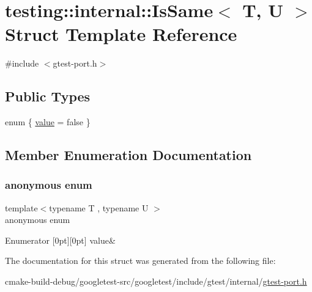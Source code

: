 \hypertarget{structtesting_1_1internal_1_1IsSame}{}\section{testing\+::internal\+::Is\+Same$<$ T, U $>$ Struct Template Reference}
\label{structtesting_1_1internal_1_1IsSame}


{\ttfamily \#include $<$gtest-\/port.\+h$>$}

\subsection*{Public Types}
\begin{DoxyCompactItemize}
\item 
enum \{ \mbox{\hyperlink{structtesting_1_1internal_1_1IsSame_a2cfeb9b5d672af954b14a257f26c67f4a58968a8c680eff4326a25fab55aa0a5e}{value}} = false
 \}
\end{DoxyCompactItemize}


\subsection{Member Enumeration Documentation}
\mbox{\label{structtesting_1_1internal_1_1IsSame_a2cfeb9b5d672af954b14a257f26c67f4}} 
\subsubsection{\texorpdfstring{anonymous enum}{anonymous enum}}
{\footnotesize\ttfamily template$<$typename T , typename U $>$ \\
anonymous enum}

\begin{DoxyEnumFields}{Enumerator}
[0pt][0pt]{}\mbox{\label{structtesting_1_1internal_1_1IsSame_a2cfeb9b5d672af954b14a257f26c67f4a58968a8c680eff4326a25fab55aa0a5e}} 
value&\\
\hline

\end{DoxyEnumFields}


The documentation for this struct was generated from the following file\+:\begin{DoxyCompactItemize}
\item 
cmake-\/build-\/debug/googletest-\/src/googletest/include/gtest/internal/\mbox{\hyperlink{gtest-port_8h}{gtest-\/port.\+h}}\end{DoxyCompactItemize}
